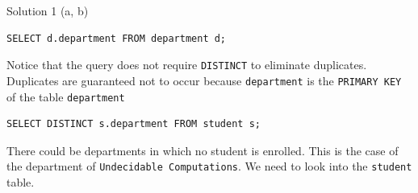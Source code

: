 \begin{frame}[fragile]{Solution 1 (a, b)}

\begin{lstlisting}		
SELECT d.department FROM department d;
\end{lstlisting}

Notice that the query does not require \texttt{DISTINCT} to eliminate duplicates. Duplicates are guaranteed not to occur because \texttt{department} is the \texttt{PRIMARY KEY} of the table \texttt{department}

\begin{lstlisting}
SELECT DISTINCT s.department FROM student s;
\end{lstlisting}

There could be departments in which no student is enrolled. This is the case of the department of \texttt{Undecidable Computations}.  We need to look into the \texttt{student} table.

\end{frame}

